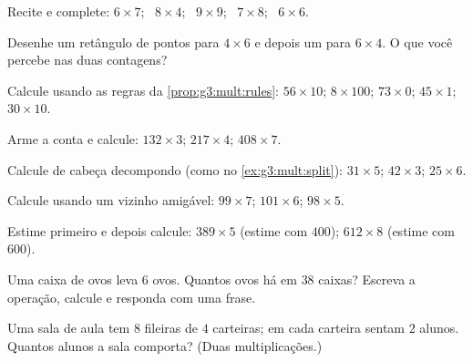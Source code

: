 \begin{exercise}[$\star$]\label{exo:g3:mult:2}
Recite e complete: $6 \times 7$; \ $8 \times 4$; \ $9 \times 9$;
\ $7 \times 8$; \ $6 \times 6$.
\end{exercise}

\begin{exercise}[$\star$]\label{exo:g3:mult:3}
Desenhe um retângulo de pontos para $4 \times 6$ e depois um para
$6 \times 4$. O que você percebe nas duas contagens?
\end{exercise}

\begin{exercise}[$\star$]\label{exo:g3:mult:4}
Calcule usando as regras da \cref{prop:g3:mult:rules}:
$56 \times 10$; \quad $8 \times 100$; \quad $73 \times 0$; \quad
$45 \times 1$; \quad $30 \times 10$.
\end{exercise}

\begin{exercise}[$\star$]\label{exo:g3:mult:5}
Arme a conta e calcule: $132 \times 3$; \quad $217 \times 4$; \quad
$408 \times 7$.
\end{exercise}

\begin{exercise}[$\star$]\label{exo:g3:mult:6}
Calcule de cabeça decompondo (como no \cref{ex:g3:mult:split}):
$31 \times 5$; \quad $42 \times 3$; \quad $25 \times 6$.
\end{exercise}

\begin{exercise}[$\star$]\label{exo:g3:mult:7}
Calcule usando um vizinho amigável: $99 \times 7$; \quad
$101 \times 6$; \quad $98 \times 5$.
\end{exercise}

\begin{exercise}[$\star$]\label{exo:g3:mult:8}
Estime primeiro e depois calcule: $389 \times 5$ (estime com $400$);
$612 \times 8$ (estime com $600$).
\end{exercise}

\begin{exercise}[$\star$]\label{exo:g3:mult:9}
Uma caixa de ovos leva $6$ ovos. Quantos ovos há em $38$ caixas?
Escreva a operação, calcule e responda com uma frase.
\end{exercise}

\begin{exercise}[$\star\star$]\label{exo:g3:mult:10}
Uma sala de aula tem $8$ fileiras de $4$ carteiras; em cada carteira
sentam $2$ alunos. Quantos alunos a sala comporta? (Duas
multiplicações.)
\end{exercise}

